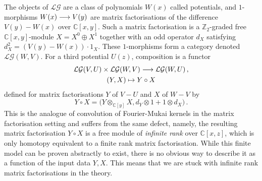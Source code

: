\documentclass[english,letter paper,12pt,leqno]{article}
\theoremstyle{example}
\numberwithin{equation}{section}
\def\LG{\mathcal{LG}}
\def\be{\begin{equation}}
\def\ee{\end{equation}}
\def\nZ{\mathds{Z}}
\def\nC{\mathds{C}}
\begin{document}
The objects of $\LG$ are a class of polynomials $W(x)$ called potentials, and $1$-morphisms $W(x) \longrightarrow V(y)$ are matrix factorisations of the difference $V(y) - W(x)$ over $\nC[x,y]$. Such a matrix factorisation is a $\nZ_2$-graded free $\nC[x,y]$-module $X = X^0 \oplus X^1$ together with an odd operator $d_X$ satisfying $d_X^2 = (V(y) - W(x)) \cdot 1_X$. These $1$-morphisms form a category denoted $\LG(W,V)$. For a third potential $U(z)$, composition is a functor
\begin{gather*}
\LG(V,U) \times \LG(W,V) \lto \LG(W,U)\,,\\
(Y , X) \mapsto Y \circ X
\end{gather*}
defined for matrix factorisations $Y$ of $V - U$ and $X$ of $W - V$ by
\be
Y \circ X = \big( Y \otimes_{\nC[y]} X, d_Y \otimes 1 + 1 \otimes d_X \big)\,.
\ee
This is the analogue of convolution of Fourier-Mukai kernels in the matrix factorisation setting and suffers from the same defect, namely, the resulting matrix factorisation $Y \circ X$ is a free module of \emph{infinite rank} over $\nC[x,z]$, which is only homotopy equivalent to a finite rank matrix factorisation. While this finite model can be proven abstractly to exist, there is no obvious way to describe it as a function of the input data $Y,X$. This means that we are stuck with infinite rank matrix factorisations in the theory.
\end{document}
